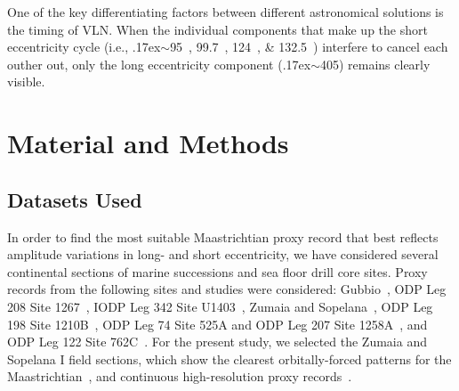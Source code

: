\documentclass[draft]{agujournal2019}
\newcommand{\appr}{\raise.17ex\hbox{\(\scriptstyle\sim\)}} %
\newcommand{\ijk}{\textcolor{blue}}
\begin{document}
One of the key differentiating factors between different astronomical solutions is the timing of \gls{VLN}.
When the individual components that make up the short eccentricity cycle (i.e., \appr\qtylist{95;99.7;124;132.5}{\kiloyear}) interfere to cancel each outher out, only the long eccentricity component (\appr\qty{405}{\kiloyear}) remains clearly visible.


\section{Material and Methods}\label{sec:mm}


\subsection{Datasets Used}\label{sec:data}

In order to find the most suitable Maastrichtian proxy record that best reflects amplitude variations in long- and short eccentricity,
we have considered several continental sections of marine successions and sea floor drill core sites.
Proxy records from the following sites and studies were considered:
Gubbio~\cite{Voigt2012,Sinnesael2016},
ODP Leg 208 Site 1267~\cite{Westerhold2007,Westerhold2008,Husson2011},
IODP Leg 342 Site U1403~\cite{Batenburg2018},
Zumaia and Sopelana~\cite{tenKateSprenger1993,Batenburg2012,Batenburg2014,Dinares-Turell2013},
ODP Leg 198 Site 1210B~\cite{Jung2012,Kim2022},
ODP Leg 74 Site 525A and ODP Leg 207 Site 1258A~,
and ODP Leg 122 Site 762C~.
For the present study, we selected the Zumaia and Sopelana I field sections,
which show the clearest orbitally-forced patterns for the Maastrichtian~\cite{tenKateSprenger1993,Batenburg2012,Dinares-Turell2013},
and continuous high-resolution proxy records~\cite{Batenburg2012,Batenburg2014}.
\end{document}
